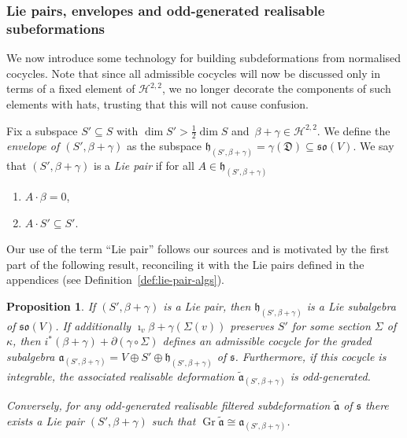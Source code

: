 \documentclass[pdftex]{sigma}
\numberwithin{equation}{section}
\newtheorem{Proposition}[Theorem]{Proposition}
 { \theoremstyle{definition}
\newtheorem{Definition}[Theorem]{Definition}
\newtheorem{Note}[Theorem]{Note}
\newtheorem{Example}[Theorem]{Example}
\newtheorem{Remark}[Theorem]{Remark} }
\newcommand{\fa}{\mathfrak{a}}
\newcommand{\fh}{\mathfrak{h}}
\newcommand{\fs}{\mathfrak{s}}
\newcommand{\fso}{\mathfrak{so}}
\newcommand{\fD}{\mathfrak{D}}
\newcommand{\cH}{\mathcal{H}}
\newcommand{\fatilde}{\widetilde{\fa}}
\newcommand{\1}{\mathbbm{1}}
\DeclareMathOperator{\Gr}{Gr}
\begin{document}
\subsubsection{Lie pairs, envelopes and odd-generated realisable subeformations}

We now introduce some technology for building subdeformations from normalised cocycles. Note that since all admissible cocycles will now be discussed only in terms of a fixed element of $\cH^{2,2}$, we no longer decorate the components of such elements with hats, trusting that this will not cause confusion.

\begin{Definition}\label{def:envelope}
	Fix a subspace $S'\subseteq S$ with $\dim S'>\frac{1}{2}\dim S$ and~${\beta+\gamma\in\cH^{2,2}}$. We define the \emph{envelope of $(S',\beta+\gamma)$} as the subspace
$\fh_{(S',\beta+\gamma)}=\gamma(\fD) \subseteq \fso(V)$.
	We say that $(S',\beta+\gamma)$ is a \emph{Lie pair} if for all $A\in\fh_{(S',\beta+\gamma)}$
	\begin{enumerate}\itemsep=0pt
	\item $A\cdot\beta=0$,
	\item $A\cdot S' \subseteq S'$.
	\end{enumerate}
\end{Definition}

Our use of the term ``Lie pair'' follows our sources \cite{Figueroa-OFarrill2017_1,Santi2022} and is motivated by the first part of the following result, reconciling it with the Lie pairs defined in the appendices (see Definition~\ref{def:lie-pair-algs}).

\begin{Proposition}\label{prop:lie-pair-admiss-cocycle}
	If $(S',\beta+\gamma)$ is a Lie pair, then $\fh_{(S',\beta+\gamma)}$ is a Lie subalgebra of $\fso(V)$. If additionally $\imath_v\beta+\gamma(\Sigma(v))$ preserves $S'$ for some section $\Sigma$ of $\kappa$, then $i^*(\beta+\gamma)+\partial(\gamma\circ\Sigma)$ defines an admissible cocycle for the graded subalgebra $\fa_{(S',\beta+\gamma)}=V\oplus S'\oplus\fh_{(S',\beta+\gamma)}$ of $\fs$. Furthermore, if this cocycle is integrable, the associated realisable deformation $\fatilde_{(S',\beta+\gamma)}$ is odd-generated.
	
	Conversely, for any odd-generated realisable filtered subdeformation $\fatilde$ of $\fs$ there exists a Lie pair $(S',\beta+\gamma)$ such that $\Gr\fatilde\cong\fa_{(S',\beta+\gamma)}$.
\end{Proposition}
\end{document}
